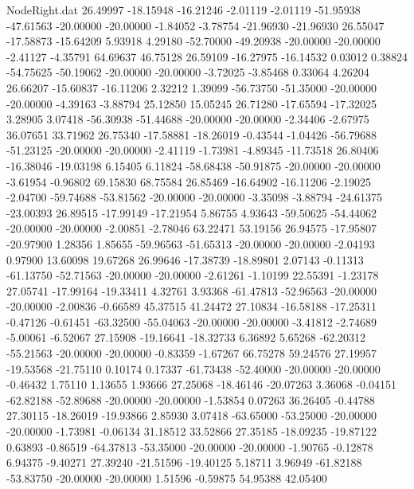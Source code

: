 \begin{filecontents}{NodeRight.dat}
  26.49997  -18.15948  -16.21246    -2.01119   -2.01119  -51.95938  -47.61563  -20.00000  -20.00000   -1.84052   -3.78754  -21.96930  -21.96930
  26.55047  -17.58873  -15.64209     5.93918    4.29180  -52.70000  -49.20938  -20.00000  -20.00000   -2.41127   -4.35791   64.69637   46.75128
  26.59109  -16.27975  -16.14532     0.03012    0.38824  -54.75625  -50.19062  -20.00000  -20.00000   -3.72025   -3.85468    0.33064    4.26204
  26.66207  -15.60837  -16.11206     2.32212    1.39099  -56.73750  -51.35000  -20.00000  -20.00000   -4.39163   -3.88794   25.12850   15.05245
  26.71280  -17.65594  -17.32025     3.28905    3.07418  -56.30938  -51.44688  -20.00000  -20.00000   -2.34406   -2.67975   36.07651   33.71962
  26.75340  -17.58881  -18.26019    -0.43544   -1.04426  -56.79688  -51.23125  -20.00000  -20.00000   -2.41119   -1.73981   -4.89345  -11.73518
  26.80406  -16.38046  -19.03198     6.15405    6.11824  -58.68438  -50.91875  -20.00000  -20.00000   -3.61954   -0.96802   69.15830   68.75584
  26.85469  -16.64902  -16.11206    -2.19025   -2.04700  -59.74688  -53.81562  -20.00000  -20.00000   -3.35098   -3.88794  -24.61375  -23.00393
  26.89515  -17.99149  -17.21954     5.86755    4.93643  -59.50625  -54.44062  -20.00000  -20.00000   -2.00851   -2.78046   63.22471   53.19156
  26.94575  -17.95807  -20.97900     1.28356    1.85655  -59.96563  -51.65313  -20.00000  -20.00000   -2.04193    0.97900   13.60098   19.67268
  26.99646  -17.38739  -18.89801     2.07143   -0.11313  -61.13750  -52.71563  -20.00000  -20.00000   -2.61261   -1.10199   22.55391   -1.23178
  27.05741  -17.99164  -19.33411     4.32761    3.93368  -61.47813  -52.96563  -20.00000  -20.00000   -2.00836   -0.66589   45.37515   41.24472
  27.10834  -16.58188  -17.25311    -0.47126   -0.61451  -63.32500  -55.04063  -20.00000  -20.00000   -3.41812   -2.74689   -5.00061   -6.52067
  27.15908  -19.16641  -18.32733     6.36892    5.65268  -62.20312  -55.21563  -20.00000  -20.00000   -0.83359   -1.67267   66.75278   59.24576
  27.19957  -19.53568  -21.75110     0.10174    0.17337  -61.73438  -52.40000  -20.00000  -20.00000   -0.46432    1.75110    1.13655    1.93666
  27.25068  -18.46146  -20.07263     3.36068   -0.04151  -62.82188  -52.89688  -20.00000  -20.00000   -1.53854    0.07263   36.26405   -0.44788
  27.30115  -18.26019  -19.93866     2.85930    3.07418  -63.65000  -53.25000  -20.00000  -20.00000   -1.73981   -0.06134   31.18512   33.52866
  27.35185  -18.09235  -19.87122     0.63893   -0.86519  -64.37813  -53.35000  -20.00000  -20.00000   -1.90765   -0.12878    6.94375   -9.40271
  27.39240  -21.51596  -19.40125     5.18711    3.96949  -61.82188  -53.83750  -20.00000  -20.00000    1.51596   -0.59875   54.95388   42.05400

\end{filecontents}
